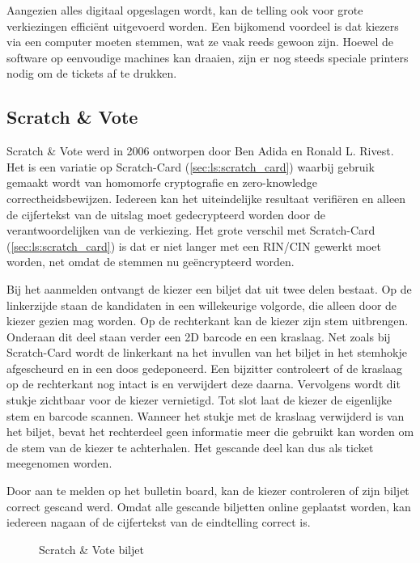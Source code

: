 \npar Aangezien alles digitaal opgeslagen wordt, kan de telling ook voor grote verkiezingen effici\"ent uitgevoerd worden. Een bijkomend voordeel is dat kiezers via een computer moeten stemmen, wat ze vaak reeds gewoon zijn. Hoewel de software op eenvoudige machines kan draaien, zijn er nog steeds speciale printers nodig om de tickets af te drukken. 

\subsection{Scratch \& Vote~\cite{adida_rivest_scratch_and_vote}}
\label{sec:ls:scratch_and_vote}

Scratch \& Vote werd in 2006 ontworpen door Ben Adida en Ronald L. Rivest. Het is een variatie op Scratch-Card (\ref{sec:ls:scratch_card}) waarbij gebruik gemaakt wordt van homomorfe cryptografie en zero-knowledge correctheidsbewijzen. Iedereen kan het uiteindelijke resultaat verifi\"eren en alleen de cijfertekst van de uitslag moet gedecrypteerd worden door de verantwoordelijken van de verkiezing. Het grote verschil met Scratch-Card (\ref{sec:ls:scratch_card}) is dat er niet langer met een RIN/CIN gewerkt moet worden, net omdat de stemmen nu ge\"encrypteerd worden.

\npar Bij het aanmelden ontvangt de kiezer een biljet dat uit twee delen bestaat. Op de linkerzijde staan de kandidaten in een willekeurige volgorde, die alleen door de kiezer gezien mag worden. Op de rechterkant kan de kiezer zijn stem uitbrengen. Onderaan dit deel staan verder een 2D barcode en een kraslaag. Net zoals bij Scratch-Card wordt de linkerkant na het invullen van het biljet in het stemhokje afgescheurd en in een doos gedeponeerd. Een bijzitter controleert of de kraslaag op de rechterkant nog intact is en verwijdert deze daarna. Vervolgens wordt dit stukje zichtbaar voor de kiezer vernietigd. Tot slot laat de kiezer de eigenlijke stem en barcode scannen. Wanneer het stukje met de kraslaag verwijderd is van het biljet, bevat het rechterdeel geen informatie meer die gebruikt kan worden om de stem van de kiezer te achterhalen. Het gescande deel kan dus als ticket meegenomen worden.

\npar Door aan te melden op het bulletin board, kan de kiezer controleren of zijn biljet correct gescand werd. Omdat alle gescande biljetten online geplaatst worden, kan iedereen nagaan of de cijfertekst van de eindtelling correct is.

\begin{figure}
  \caption{Scratch \& Vote biljet\cite{adida_rivest_scratch_and_vote}}
  \label{fig:ls:scratch_and_vote_ballot}
\end{figure}

